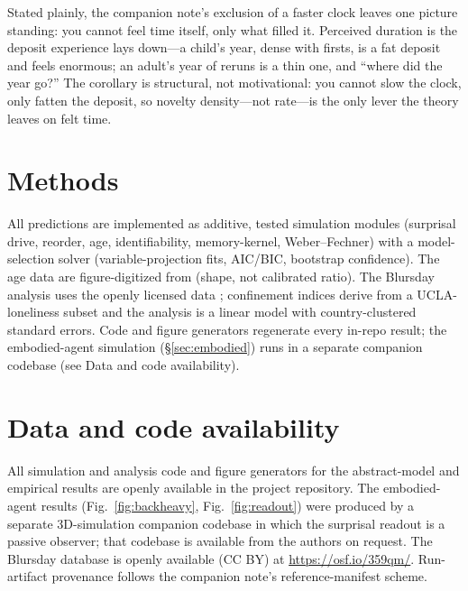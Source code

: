 \documentclass[11pt]{article}
\begin{document}
Stated plainly, the companion note's exclusion of a faster clock leaves one picture
standing: you cannot feel time itself, only what filled it. Perceived duration is the
deposit experience lays down---a child's year, dense with firsts, is a fat deposit and
feels enormous; an adult's year of reruns is a thin one, and ``where did the year go?''
The corollary is structural, not motivational: you cannot slow the clock, only fatten the
deposit, so novelty density---not rate---is the only lever the theory leaves on felt time.

\section{Methods}
All predictions are implemented as additive, tested simulation modules (surprisal drive,
reorder, age, identifiability, memory-kernel, Weber--Fechner) with a model-selection
solver (variable-projection fits, AIC/BIC, bootstrap confidence). The age data are
figure-digitized from \citet{wittmann2005age} (shape, not calibrated ratio). The Blursday
analysis uses the openly licensed data \citep{chaumon2022blursday}; confinement indices
derive from a UCLA-loneliness subset \citep{russell1996ucla} and the analysis is a
linear model with country-clustered standard errors. Code and figure generators
regenerate every in-repo result; the embodied-agent simulation (\S\ref{sec:embodied})
runs in a separate companion codebase (see Data and code availability).

\section*{Data and code availability}
All simulation and analysis code and figure generators for the abstract-model and
empirical results are openly available in the project repository. The embodied-agent
results (Fig.~\ref{fig:backheavy}, Fig.~\ref{fig:readout}) were produced by a separate
3D-simulation companion codebase in which the surprisal readout is a passive observer;
that codebase is available from the authors on request. The Blursday database is openly
available (CC BY) at \url{https://osf.io/359qm/}. Run-artifact provenance follows the
companion note's reference-manifest scheme.



\end{document}

